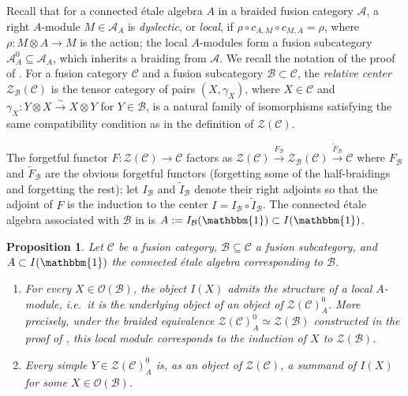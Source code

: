 \documentclass[10pt]{article}
\theoremstyle{plain}
\newtheorem{proposition}[theorem]{Proposition}
\theoremstyle{definition}
\theoremstyle{plain}
\newcommand{\Z}{\mathcal{Z}}
\begin{document}
Recall \cite[Definition 3.12]{MR3039775} that for a connected \'etale algebra $A$ in a
braided fusion category $\mathcal{A}$, a right $A$-module $M \in \mathcal{A}_A$ is
\emph{dyslectic}, or \emph{local}, if $\rho \circ c_{A,M}\circ c_{M,A} = \rho$,
where $\rho \colon M \otimes A \to M$ is the action; the local $A$-modules form a
fusion subcategory $\mathcal{A}^0_A \subseteq \mathcal{A}_A$, which inherits a braiding from $\mathcal{A}$. We recall the notation of the proof of \cite[Theorem 4.10]{MR3039775}. For a fusion category $\mathcal{C}$ and a fusion subcategory $\mathcal{B}\subset\mathcal{C}$, the
\emph{relative center} $\Z_\mathcal{B}(\mathcal{C})$ is the tensor category of pairs
$(X,\gamma_X)$, where $X\in\mathcal{C}$ and
$\gamma_X:Y\otimes X\stackrel{\sim}{\to}X \otimes Y$ for $Y\in\mathcal{B}$, is
a natural family of isomorphisms satisfying the same compatibility condition as
in the definition of $\Z(\mathcal{C})$.

\par The forgetful functor $F:\Z(\mathcal{C})\to\mathcal{C}$ factors as $\Z(\mathcal{C})\stackrel{F_\mathcal{B}}{\longrightarrow}\Z_\mathcal{B}(\mathcal{C})\stackrel{\widetilde{F}_\mathcal{B}}{\longrightarrow}\mathcal{C}$ where $F_\mathcal{B}$ and $\widetilde{F}_\mathcal{B}$ are the obvious forgetful functors (forgetting some of the half-braidings and forgetting the rest); let $I_\mathcal{B}$
and $\widetilde{I}_\mathcal{B}$ denote their right adjoints so that the adjoint of $F$ is the induction to the center $I=I_\mathcal{B}\circ\widetilde{I}_\mathcal{B}$. The connected \'etale algebra associated with $\mathcal{B}$ in \cite[Theorem 4.10]{MR3039775} is $A:=I_\mathcal{B}(\mathbbm{1})\subset I(\mathbbm{1})$.


\begin{proposition}\label{correspond}
Let $\mathcal{C}$ be a fusion category, $\mathcal{B}\subseteq\mathcal{C}$ a fusion subcategory, and
$A\subset I(\mathbbm{1})$ the connected \'etale algebra
corresponding to $\mathcal{B}$.
\begin{enumerate}
\item For every $X\in\mathcal{O}(\mathcal{B})$, the object $I(X)$ admits the structure of a local $A$-module, i.e.\ it is the underlying object of an object of $\mathcal{Z}(\mathcal{C})_A^0$. More precisely, under the braided equivalence $\mathcal{Z}(\mathcal{C})_A^0\simeq\mathcal{Z}(\mathcal{B})$ constructed in the proof of \cite[Theorem 4.10]{MR3039775}, this local module corresponds to the induction of $X$ to $\mathcal{Z}(\mathcal{B})$.
\item Every simple $Y\in\mathcal{Z}(\mathcal{C})_A^0$ is, as an object of $\mathcal{Z}(\mathcal{C})$, a summand of $I(X)$ for some $X\in\mathcal{O}(\mathcal{B})$.
\end{enumerate}
\end{proposition}
\end{document}
